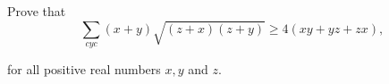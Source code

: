 Prove that\[\sum_{cyc}(x+y)\sqrt{(z+x)(z+y)} \geq 4(xy+yz+zx),\]

for all positive real numbers $x,y$ and $z$.